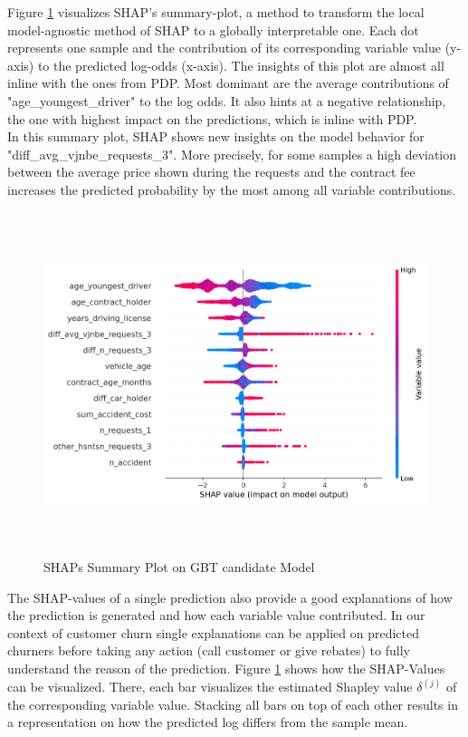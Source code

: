 \documentclass[12pt,titlepage]{article}
\begin{document}
Figure \ref{fig:shapsum} visualizes SHAP's summary-plot, a method  to transform the local model-agnostic method of SHAP to a globally interpretable one. Each dot represents one sample and the contribution of its corresponding variable value (y-axis) to the predicted log-odds (x-axis). The insights of this plot are almost all inline with the ones from PDP. Most dominant are the average contributions of "age\_youngest\_driver" to the log odds. It also hints at a negative relationship, the one with highest impact on the predictions, which is inline with PDP. \\
In this summary plot, SHAP shows new insights on the model behavior for "diff\_avg\_vjnbe\_requests\_3". More precisely, for some samples a high deviation between the average price shown during the requests and the contract fee increases the predicted probability by the most among all variable contributions. \\
\begin{figure}[H]
    \centerline{\includegraphics[height=10cm]{shap_summary.png}}
\caption{SHAPs Summary Plot on GBT candidate Model}
\label{fig:shapsum}
\end{figure}
\noindent
The SHAP-values of a single prediction also provide a good explanations of how the prediction is generated and how each variable value contributed. In our context of customer churn single explanations can be applied on predicted churners before taking any action (call customer or give rebates) to fully understand the reason of the prediction. Figure \ref{fig:shapsum} shows how the SHAP-Values can be visualized. There, each bar visualizes the estimated Shapley value $\delta^{(j)}$ of the corresponding variable value. Stacking all bars on top of each other results in a representation on how the predicted log differs from the sample mean.\\
\end{document}
